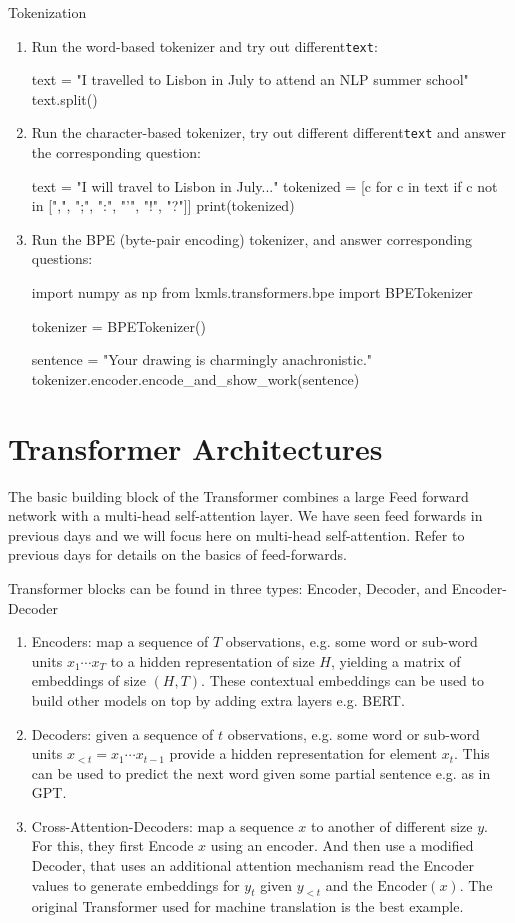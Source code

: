 \begin{exercise}
Tokenization
\begin{enumerate}
\item Run the word-based tokenizer and try out different{\tt text}:
\begin{python}
text = "I travelled to Lisbon in July to attend an NLP summer school"
text.split()
\end{python}
\item Run the character-based tokenizer, try out different different{\tt text} and answer the corresponding question:
\begin{python}
text = "I will travel to Lisbon in July..."
tokenized = [c for c in text if c not in [",", ";", ":", "'", "!", "?"]]
print(tokenized)
\end{python}
\item Run the BPE (byte-pair encoding) tokenizer, and answer corresponding questions:
\begin{python}
import numpy as np
from lxmls.transformers.bpe import BPETokenizer

tokenizer = BPETokenizer()

sentence = "Your drawing is charmingly anachronistic."
tokenizer.encoder.encode_and_show_work(sentence)
\end{python}
\end{enumerate}
\end{exercise}
\section{Transformer Architectures}

The basic building block of the Transformer combines a large Feed forward network with a multi-head self-attention layer. We have seen feed forwards in previous days and we will focus here on multi-head self-attention. Refer to previous days for details on the basics of feed-forwards.

Transformer blocks can be found in three types: Encoder, Decoder, and Encoder-Decoder 

\begin{enumerate}
\item Encoders: map a sequence of $T$ observations, e.g. some word or sub-word units $x_1 \cdots x_T$ to a hidden representation of size $H$, yielding a matrix of embeddings of size $(H, T)$. These contextual embeddings can be used to build other models on top by adding extra layers e.g. BERT.
\item Decoders: given a sequence of $t$ observations, e.g. some word or sub-word units $x_{<t} = x_1 \cdots x_{t-1}$ provide a hidden representation for element $x_t$. This can be used to predict the next word given some partial sentence e.g. as in GPT. 
\item Cross-Attention-Decoders: map a sequence $x$ to another of different size $y$. For this, they first Encode $x$ using an encoder. And then use a modified Decoder, that uses an additional attention mechanism read the Encoder values to generate embeddings for $y_t$ given $y_{<t}$ and the $\mathrm{Encoder}(x)$. The original Transformer used for machine translation is the best example.
\end{enumerate}

